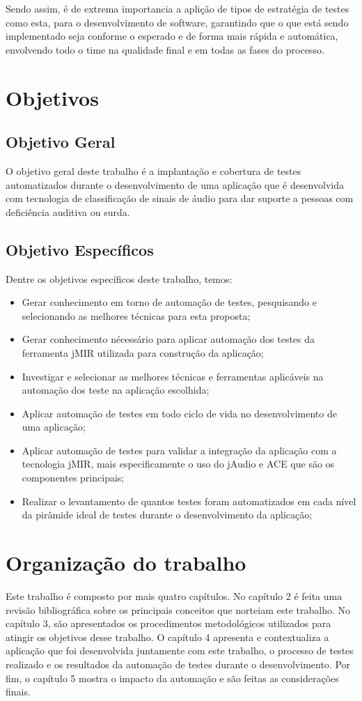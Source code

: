 Sendo assim, é de extrema importancia a aplição de tipos de estratégia de testes como esta, para o desenvolvimento de software, garantindo que o que está sendo implementado seja conforme o esperado e de forma mais rápida e automática, envolvendo todo o time na qualidade final e em todas as fases do processo. 


\section{Objetivos} 

\subsection{Objetivo Geral}

O objetivo geral deste trabalho é a implantação e cobertura de testes automatizados durante o desenvolvimento de uma aplicação que é desenvolvida com tecnologia de classificação de sinais de áudio para dar suporte a pessoas com deficiência auditiva ou surda.

\subsection{Objetivo Específicos}
Dentre os objetivos específicos deste trabalho, temos:  
\begin{itemize}
	\item Gerar conhecimento em torno de automação de testes, pesquisando e selecionando as melhores técnicas para esta proposta;
	\item Gerar conhecimento nécessário para aplicar automação dos testes da ferramenta jMIR utilizada para construção da aplicação;
	\item Investigar e selecionar as melhores técnicas e ferramentas aplicáveis na automação dos teste na aplicação escolhida;
	\item Aplicar automação de testes em todo ciclo de vida no desenvolvimento de uma aplicação;	
	\item Aplicar automação de testes para validar a integração da aplicação com a tecnologia jMIR, mais especificamente o uso do jAudio e ACE que são os componentes principais;
	\item Realizar o levantamento de quantos testes foram automatizados em cada nível da pirâmide ideal de testes durante o desenvolvimento da aplicação;
\end{itemize}

\section{Organização do trabalho}

Este trabalho é composto por mais quatro capítulos. No capítulo 2 é feita uma revisão bibliográfica sobre os principais conceitos que norteiam este trabalho. No capítulo 3, são apresentados os procedimentos metodológicos utilizados para atingir os objetivos desse trabalho. O capítulo 4 apresenta e contextualiza a aplicação que foi desenvolvida juntamente com este trabalho, o processo de testes realizado e os resultados da automação de testes durante o desenvolvimento. Por fim, o capítulo 5 mostra o impacto da automação e são feitas as considerações finais.